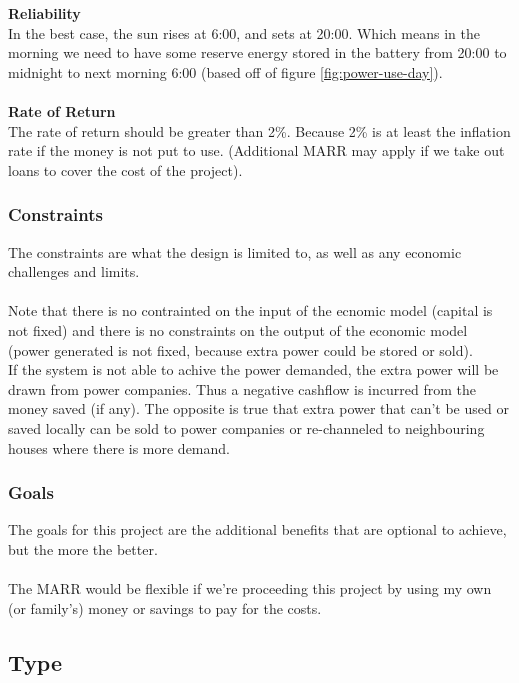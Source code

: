 \documentclass[10pt,letterpaper]{article}
\begin{document}
\textbf{Reliability}\\
In the best case, the sun rises at 6:00, and sets at 20:00. Which means in the morning we need to have some reserve energy stored in the battery from 20:00 to midnight to next morning 6:00 (based off of figure \ref{fig:power-use-day}).\\
\\
\textbf{Rate of Return}\\
The rate of return should be greater than 2\%. Because 2\% is at least the inflation rate if the money is not put to use. (Additional MARR may apply if we take out loans to cover the cost of the project).

\subsubsection{Constraints}

The constraints are what the design is limited to, as well as any economic challenges and limits.\\
\\
Note that there is no contrainted on the input of the ecnomic model (capital is not fixed) and there is no constraints on the output of the economic model (power generated is not fixed, because extra power could be stored or sold).
\\
If the system is not able to achive the power demanded, the extra power will be drawn from power companies. Thus a negative cashflow is incurred from the money saved (if any). The opposite is true that extra power that can't be used or saved locally can be sold to power companies or re-channeled to neighbouring houses where there is more demand.\\

\subsubsection{Goals}

The goals for this project are the additional benefits that are optional to achieve, but the more the better.\\
\\
The MARR would be flexible if we're proceeding this project by using my own (or family's) money or savings to pay for the costs.

\subsection{Type}
\end{document}
